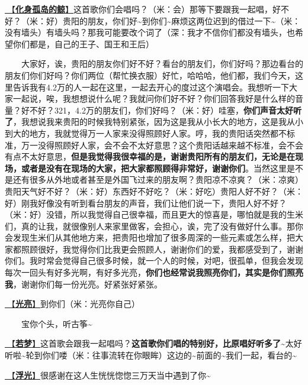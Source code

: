 \documentclass[]{ctexbook}
\begin{document}
\hyperref[hua-shen-gu-dao-de-jing]{🎵【\textbf{化身孤岛的鲸}】}这首歌你们会唱吗？（米：会）那等下要跟我一起唱，好不好？（米：好）贵阳的朋友，你们好\textasciitilde 到你们\textasciitilde 麻烦这两位迟到的借过一下\textasciitilde（米：没有墙头）有墙头吗？那我可能要改个词了（深：我才不信你们都没有墙头，也希望你们都是，自己的王子、国王和王后）

  大家好，诶，贵阳的朋友你们好不好？看台的朋友们，你们好吗？那边看台的朋友们你们好吗？你们两位（帮忙换衣服）好忙，哈哈哈，他们都，我们今天，这里告诉我有4.2万的人一起在这里，一起去开心的度过这个演唱会。我想听一下大家一起说，唉，我想想说什么呢？我就问你们好不好？你们回答我好是什么样的音量？好不好？321，4.2万的朋友们，你们好吗？（米：好）哇塞，\textbf{你们声音太好听了}，我想说我来贵阳的时候我特别紧张，因为这是我从小长大的地方，这是我从小到大的地方，我就觉得万一人家来没得照顾好人家。哼，我的贵阳话突然都不标准，万一没得照顾好人家，会不会不太好意思？这个贵阳话越来越不标准，会不会有点不太好意思，\textbf{但是我觉得我很幸福的是，谢谢贵阳所有的朋友们，无论是在现场，或者是没有在现场的大家，把大家都照顾得非常好，谢谢你们}。当然这里是不是还有很多从外地或者甚至是外国飞过来的朋友啊？贵阳凉不凉爽？（米：凉爽）贵阳天气好不好？（米：好）东西好不好吃？（米：好吃）贵阳人好不好？（米：好）刚我好像没有听到看台朋友的声音，我们让他们说一下，贵阳人好不好？（米：好）没错，所以我觉得自己很幸福，而且更大的惊喜是，哪怕就是我的生米们，真的让我，就很像别人来家里做客，会担心，诶，完了没有做好什么事。那你会发现生米们从其他地方来，把贵阳也增加了很多周深的一些元素或怎么样，把大家都照顾很好，我觉得你们比我更会照顾人，谢谢你们的爱，我都感受到了，谢谢你们。我时常会觉得自己很多时候，就一个人的时候，对吧，很孤单，但我会发现每次一回头有好多光啊，有好多光亮，\textbf{你们也经常说我照亮你们，其实是你们照亮我}，谢谢你们每一份光亮。好紧张好紧张。

\hyperref[silver-linings]{🎵【\textbf{光亮}】}到你们（米：光亮你自己）

  宝你个头，听古筝\textasciitilde{}

\hyperref[ruomeng]{🎵【\textbf{若梦}】}这首歌会跟我一起唱吗？\textbf{这首歌你们唱的特别好，比原唱好听多了\textasciitilde{}}太好听啦\textasciitilde 轮到你们喽（米：往事流转在你眼眸）这边的\textasciitilde 前面的\textasciitilde 我们一起，看台的\textasciitilde{}

\hyperref[floating-light]{🎵【\textbf{浮光}】}很感谢在这人生恍恍惚惚三万天当中遇到了你\textasciitilde{}
\end{document}
